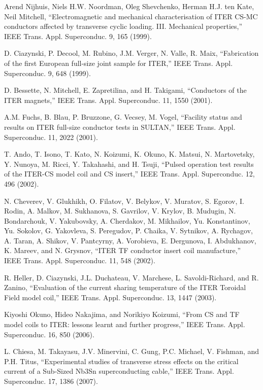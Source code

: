 \noindent [9.46] Arend Nijhuis, Niels H.W. Noordman, Oleg Shevchenko, Herman H.J. ten Kate,
Neil Mitchell, ``Electromagnetic and mechanical characterisation of ITER CS-MC
conductors affected by transverse cyclic loading. III. Mechanical properties,” IEEE
Trans. Appl. Superconduc. 9, 165 (1999).

\noindent [9.47] D. Ciazynski, P. Decool, M. Rubino, J.M. Verger, N. Valle, R. Maix, ``Fabrication
of the first European full-size joint sample for ITER,” IEEE Trans. Appl. Superconduc.
9, 648 (1999).

\noindent [9.48] D. Bessette, N. Mitchell, E. Zapretilina, and H. Takigami, ``Conductors of the ITER
magnets,” IEEE Trans. Appl. Superconduc. 11, 1550 (2001).

\noindent [9.49] A.M. Fuchs, B. Blau, P. Bruzzone, G. Vecsey, M. Vogel, ``Facility status and results
on ITER full-size conductor tests in SULTAN,” IEEE Trans. Appl. Superconduc.
11, 2022 (2001).

\noindent [9.50] T. Ando, T. Isono, T. Kato, N. Koizumi, K. Okuno, K. Matsui, N. Martovetsky,
Y. Nunoya, M. Ricci, Y. Takahashi, and H. Tsuji, ``Pulsed operation test results
of the ITER-CS model coil and CS insert,” IEEE Trans. Appl. Superconduc. 12,
496 (2002).

\noindent [9.51] N. Cheverev, V. Glukhikh, O. Filatov, V. Belykov, V. Muratov, S. Egorov, I. Rodin,
A. Malkov, M. Sukhanova, S. Gavrilov, V. Krylov, B. Mudugin, N. Bondarchouk,
V. Yakubovsky, A. Cherdakov, M. Mikhailov, Yu. Konstantinov, Yu. Sokolov,
G. Yakovleva, S. Peregudov, P. Chaika, V. Sytnikov, A. Rychagov, A. Taran,
A. Shikov, V. Pantcyrny, A. Vorobieva, E. Dergunova, I. Abdukhanov, K. Mareev,
and N. Grysnov, ``ITER TF conductor insert coil manufacture,” IEEE Trans. Appl.
Superconduc. 11, 548 (2002).

\noindent [9.52] R. Heller, D. Ciazynski, J.L. Duchateau, V. Marchese, L. Savoldi-Richard, and R.
Zanino, ``Evaluation of the current sharing temperature of the ITER Toroidal Field
model coil,” IEEE Trans. Appl. Superconduc. 13, 1447 (2003).

\noindent [9.53] Kiyoshi Okuno, Hideo Nakajima, and Norikiyo Koizumi, ``From CS and TF model
coils to ITER: lessons learnt and further progress,” IEEE Trans. Appl. Superconduc.
16, 850 (2006).

\noindent [9.54] L. Chiesa, M. Takayasu, J.V. Minervini, C. Gung, P.C. Michael, V. Fishman, and
P.H. Titus, ``Experimental studies of transverse stress effects on the critical current
of a Sub-Sized Nb3Sn superconducting cable,” IEEE Trans. Appl. Superconduc.
17, 1386 (2007).

